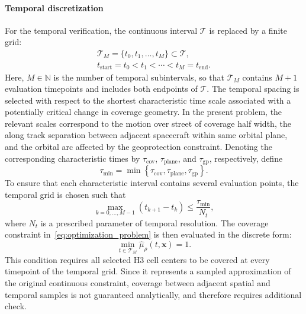 \paragraph{Temporal discretization}

For the temporal verification, the continuous interval $\mathcal{T}$ is replaced by a finite grid:
\begin{equation}
    \begin{gathered}
        \mathcal{T}_M=\{t_0,t_1,\ldots,t_M\}\subset\mathcal{T},\\
        t_{\mathrm{start}}=t_0<t_1<\cdots<t_M=t_{\mathrm{end}}.
    \end{gathered}
    \label{eq:time_grid}
\end{equation}
Here, $M\in\mathbb{N}$ is the number of temporal subintervals, so that $\mathcal{T}_M$ contains $M+1$ evaluation timepoints 
and includes both endpoints of $\mathcal{T}$.
The temporal spacing is selected with respect to the shortest characteristic time scale associated with a potentially 
critical change in coverage geometry. In the present problem, the relevant scales correspond to the motion 
over street of coverage half width, the along track separation between adjacent spacecraft within same orbital plane, 
and the orbital arc affected by the geoprotection constraint. Denoting the corresponding characteristic times by $\tau_{\mathrm{cov}}$, 
$\tau_{\mathrm{plane}}$, and $\tau_{\mathrm{gp}}$, respectively, define
\begin{equation}
    \tau_{\min}=\min\left\{\tau_{\mathrm{cov}},\tau_{\mathrm{plane}},\tau_{\mathrm{gp}}\right\}.
    \label{eq:min_characteristic_time}
\end{equation}
To ensure that each characteristic interval contains several evaluation points, the temporal grid is chosen such that
\begin{equation}
    \max_{k=0,\ldots,M-1}\left(t_{k+1}-t_k\right)\leq\frac{\tau_{\min}}{N_t},
    \label{eq:time_step_condition}
\end{equation}
where $N_t$ is a prescribed parameter of temporal resolution.
The coverage constraint in~\eqref{eq:optimization_problem} is then evaluated in the discrete form:
\begin{equation}
    \min_{t\in\mathcal{T}_M}
        \widehat{\mu}_{\rho}(t,\mathbf{x})=1.
    \label{eq:discrete_time_coverage}
\end{equation}
This condition requires all selected H3 cell centers to be covered at every timepoint of the temporal grid. 
Since it represents a sampled approximation of the original continuous constraint, coverage between adjacent 
spatial and temporal samples is not guaranteed analytically, and therefore requires additional check.
